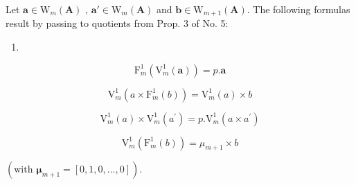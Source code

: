 Let \(\boldsymbol{a} \in \mathrm{W}_{m}(\mathbf{A})\) , \(\boldsymbol{a}' \in \mathrm{W}_{m}(\mathbf{A})\) and \(\boldsymbol{b} \in \mathrm{W}_{m+1}(\mathbf{A})\). The following formulas result by passing to quotients from Prop. 3 of No. 5:

\begin{enumerate}
\def\labelenumi{(\arabic{enumi})}
\setcounter{enumi}{46}
\tightlist
\item
\end{enumerate}

\[
\mathrm{F} _ {m} ^ {1} \left(\mathrm{V} _ {m} ^ {1} (\boldsymbol {a})\right) = p. \boldsymbol {a}\tag{48}
\]

\[
\mathrm{V} _ {m} ^ {1} (a \times \mathrm{F} _ {m} ^ {1} (b)) = \mathrm{V} _ {m} ^ {1} (a) \times b\tag{49}
\]

\[
\mathrm{V} _ {m} ^ {1} (a) \times \mathrm{V} _ {m} ^ {1} (a ^ {\prime}) = p. \mathrm{V} _ {m} ^ {1} (a \times a ^ {\prime})\tag{50}
\]

\[
\mathrm{V} _ {m} ^ {1} (\mathrm{F} _ {m} ^ {1} (b)) = \mu_ {m + 1} \times b
\]

\((\text{with } \boldsymbol{\mu}_{m+1} = [0, 1, 0, ..., 0]).\)

